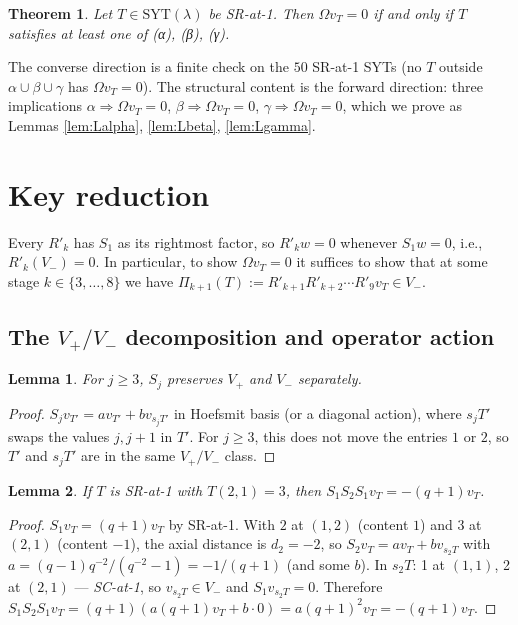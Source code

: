 \documentclass[11pt]{article}
\newtheorem{theorem}{Theorem}
\newtheorem{lemma}{Lemma}
\newcommand{\Vp}{V_{+}}
\newcommand{\Vm}{V_{-}}
\begin{document}
\begin{theorem} \label{thm:main}
Let $T \in \mathrm{SYT}(\lambda)$ be SR-at-1. Then $\Omega v_T = 0$ if and only if
$T$ satisfies at least one of {\normalfont(α), (β), (γ)}.
\end{theorem}

The converse direction is a finite check on the $50$ SR-at-1 SYTs (no $T$ outside
$\alpha \cup \beta \cup \gamma$ has $\Omega v_T = 0$). The structural content
is the forward direction: three implications $\alpha \Rightarrow \Omega v_T = 0$,
$\beta \Rightarrow \Omega v_T = 0$, $\gamma \Rightarrow \Omega v_T = 0$,
which we prove as Lemmas \ref{lem:Lalpha}, \ref{lem:Lbeta}, \ref{lem:Lgamma}.

\section{Key reduction}

Every $R'_k$ has $S_1$ as its rightmost factor, so $R'_k w = 0$ whenever
$S_1 w = 0$, i.e., $R'_k(\Vm) = 0$. In particular, to show $\Omega v_T = 0$
it suffices to show that at some stage $k \in \{3,\ldots,8\}$ we have
$\Pi_{k+1}(T) := R'_{k+1} R'_{k+2} \cdots R'_9 v_T \in \Vm$.

\subsection*{The $\Vp/\Vm$ decomposition and operator action}

\begin{lemma} \label{lem:preserves}
For $j \ge 3$, $S_j$ preserves $\Vp$ and $\Vm$ separately.
\end{lemma}
\begin{proof}
$S_j v_{T'} = a v_{T'} + b v_{s_j T'}$ in Hoefsmit basis (or a diagonal action),
where $s_j T'$ swaps the values $j, j+1$ in $T'$. For $j \ge 3$, this does not
move the entries $1$ or $2$, so $T'$ and $s_j T'$ are in the same $\Vp/\Vm$ class.
\end{proof}

\begin{lemma} \label{lem:S1S2S1}
If $T$ is SR-at-1 with $T(2,1) = 3$, then $S_1 S_2 S_1 v_T = -(q+1) v_T$.
\end{lemma}
\begin{proof}
$S_1 v_T = (q+1) v_T$ by SR-at-1. With $2$ at $(1,2)$ (content $1$) and $3$ at
$(2,1)$ (content $-1$), the axial distance is $d_2 = -2$, so
$S_2 v_T = a v_T + b v_{s_2 T}$ with $a = (q-1) q^{-2}/(q^{-2}-1) = -1/(q+1)$
(and some $b$). In $s_2 T$: 1 at $(1,1)$, 2 at $(2,1)$ — \emph{SC-at-1}, so
$v_{s_2 T} \in \Vm$ and $S_1 v_{s_2 T} = 0$.
Therefore
$
S_1 S_2 S_1 v_T = (q+1) (a (q+1) v_T + b \cdot 0) = a(q+1)^2 v_T = -(q+1) v_T.
$
\end{proof}
\end{document}
